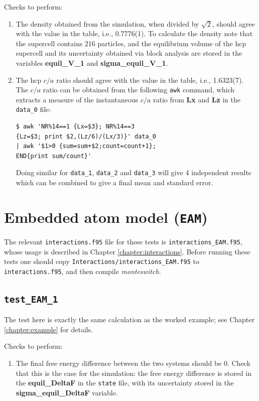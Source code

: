 \documentclass{report}
\begin{document}
Checks to perform:
\begin{enumerate}
\item
The density obtained from the simulation, when divided by $\sqrt{2}$, should agree with the value in the table,
i.e., 0.7776(1). To calculate the density note that the supercell contains 216 particles, and the equilibrium
volume of the hcp supercell and its uncertainty obtained via block analysis are stored in the variables
\textbf{equil\_V\_1} and \textbf{sigma\_equil\_V\_1}.
\item
The hcp $c/a$ ratio should agree with the value in the table, i.e., 1.6323(7). The $c/a$ ratio can be obtained from
the following \texttt{awk} command, which extracts a measure of the instantaneous $c/a$ ratio from \textbf{Lx} and \textbf{Lz} in the
\texttt{data\_0} file:
\begin{verbatim}
$ awk 'NR%14==1 {Lx=$3}; NR%14==3 
{Lz=$3; print $2,(Lz/6)/(Lx/3)}' data_0 
| awk '$1>0 {sum=sum+$2;count=count+1}; 
END{print sum/count}'
\end{verbatim}
Doing similar for \texttt{data\_1}, \texttt{data\_2} and \texttt{data\_3} will give 4 independent results which can be combined
to give a final mean and standard error.
\end{enumerate}


\section{Embedded atom model (\texttt{EAM})}
The relevant \texttt{interactions.f95} file for these tests is \texttt{interactions\_EAM.f95}, whose usage is described in Chapter
\ref{chapter:interactions}. Before running these tests one should copy \texttt{Interactions/interactions\_EAM.f95}
to \texttt{interactions.f95}, and then compile \emph{monteswitch}.


\subsection{\texttt{test\_EAM\_1}}
The test here is exactly the same calculation as the worked example; see Chapter \ref{chapter:example} for details.

Checks to perform:
\begin{enumerate}
\item
The final free energy difference between the two systems should be 0. Check that this is the case for the
simulation: the free energy difference is stored in the \textbf{equil\_DeltaF} in the \texttt{state} file, with its uncertainty
stored in the \textbf{sigma\_equil\_DeltaF} variable.
\end{enumerate}
\end{document}
